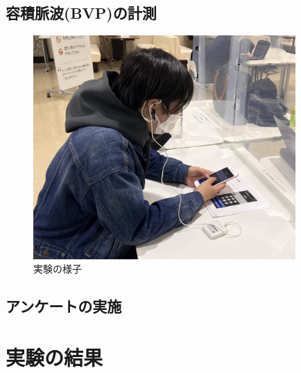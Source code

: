 \subsection{容積脈波(BVP)の計測}

\begin{figure}[htbp]
  \begin{minipage}{\hsize}
    \begin{center}
       \includegraphics[width=100mm]{img/experience.jpg}
    \end{center}
    \caption{実験の様子}
    \label{fig:observe}
  \end{minipage}
\end{figure}

\subsection{アンケートの実施}
\cite{stressquestionare}

\section{実験の結果}

